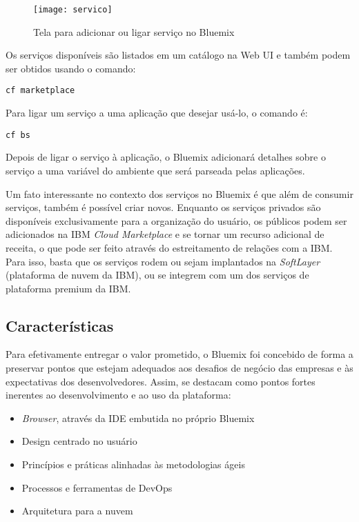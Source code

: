 \begin{figure}[!htb]
    \centering
    \texttt{[image: servico]}
    \caption{Tela para adicionar ou ligar serviço no Bluemix}
    \label{Rotulo}
\end{figure}

Os serviços disponíveis são listados em um catálogo na Web UI e também podem ser obtidos usando o comando:
\begin{lstlisting}
cf marketplace
\end{lstlisting}

Para ligar um serviço a uma aplicação que desejar usá-lo, o comando é:
\begin{lstlisting}
cf bs
\end{lstlisting}

Depois de ligar o serviço à aplicação, o Bluemix adicionará detalhes sobre o serviço a uma variável do ambiente que será parseada pelas aplicações.

Um fato interessante no contexto dos serviços no Bluemix é que além de consumir serviços, também é possível criar novos. Enquanto os serviços privados são disponíveis exclusivamente para a organização do usuário, os públicos podem ser adicionados na IBM \textit{Cloud Marketplace} e se tornar um recurso adicional de receita, o que pode ser feito através do estreitamento de relações com a IBM. Para isso, basta que os serviços rodem ou sejam implantados na \textit{SoftLayer} (plataforma de nuvem da IBM), ou se integrem com um dos serviços de plataforma premium da IBM.

\subsection{Características}

Para efetivamente entregar o valor prometido, o Bluemix foi concebido de forma a preservar pontos que estejam adequados aos desafios de negócio das empresas e às expectativas dos desenvolvedores. Assim, se destacam como pontos fortes inerentes ao desenvolvimento e ao uso da plataforma:
\begin{itemize}
    \item \textit{Browser}, através da IDE embutida no próprio Bluemix
    \item  Design centrado no usuário
    \item  Princípios e práticas alinhadas às metodologias ágeis
    \item  Processos e ferramentas de DevOps
    \item  Arquitetura para a nuvem
\end{itemize}

